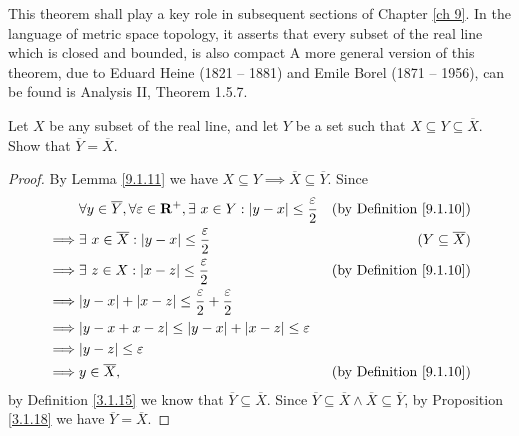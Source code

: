 \begin{remark}\label{9.1.25}
    This theorem shall play a key role in subsequent sections of Chapter \ref{ch 9}.
    In the language of metric space topology, it asserts that every subset of the real line which is closed and bounded, is also compact
    A more general version of this theorem, due to Eduard Heine (1821 -- 1881) and Emile Borel (1871 -- 1956), can be found is Analysis II, Theorem 1.5.7.
\end{remark}

\exercisesection

\begin{exercise}\label{ex 9.1.1}
    Let \(X\) be any subset of the real line, and let \(Y\) be a set such that \(X \subseteq Y \subseteq \overline{X}\).
    Show that \(\overline{Y} = \overline{X}\).
\end{exercise}

\begin{proof}
    By Lemma \ref{9.1.11} we have \(X \subseteq Y \implies \overline{X} \subseteq \overline{Y}\).
    Since
    \begin{align*}
                 & \forall y \in \overline{Y}, \forall \varepsilon \in \R^+, \exists\ x \in Y : \abs{y - x} \leq \frac{\varepsilon}{2} & \text{(by Definition \ref{9.1.10})} \\
        \implies & \exists\ x \in \overline{X} : \abs{y - x} \leq \frac{\varepsilon}{2}                                                & (Y \subseteq \overline{X})          \\
        \implies & \exists\ z \in X : \abs{x - z} \leq \frac{\varepsilon}{2}                                                           & \text{(by Definition \ref{9.1.10})} \\
        \implies & \abs{y - x} + \abs{x - z} \leq \frac{\varepsilon}{2} + \frac{\varepsilon}{2}                                                                              \\
        \implies & \abs{y - x + x - z} \leq \abs{y - x} + \abs{x - z} \leq \varepsilon                                                                                       \\
        \implies & \abs{y - z} \leq \varepsilon                                                                                                                              \\
        \implies & y \in \overline{X},                                                                                                 & \text{(by Definition \ref{9.1.10})}
    \end{align*}
    by Definition \ref{3.1.15} we know that \(\overline{Y} \subseteq \overline{X}\).
    Since \(\overline{Y} \subseteq \overline{X} \land \overline{X} \subseteq \overline{Y}\), by Proposition \ref{3.1.18} we have \(\overline{Y} = \overline{X}\).
\end{proof}

